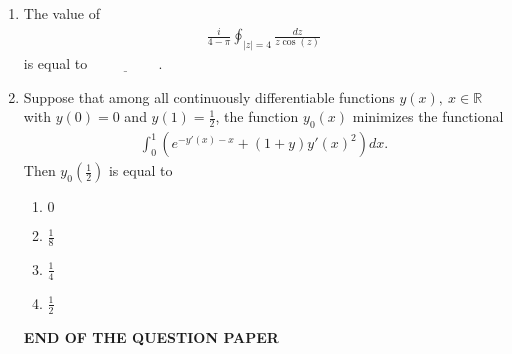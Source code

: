 \documentclass[journal]{IEEEtran}
\numberwithin{equation}{enumi}
\numberwithin{figure}{enumi}
\begin{document}
\begin{enumerate}
\item The value of
\begin{align*}
\frac{i}{4 - \pi} \oint_{|z| = 4} \frac{dz}{z \cos(z)}
\end{align*}
is equal to \(\underline{\hspace{2cm}}\).
\hfill{}

\vspace{1em}

\item Suppose that among all continuously differentiable functions \( y(x), \ x \in \mathbb{R} \) with \( y(0) = 0 \) and \( y(1) = \frac{1}{2} \), the function \( y_0(x) \) minimizes the functional
\begin{align*}
\int_{0}^{1} \left( e^{-y'(x) - x} + (1+y)y'(x)^2 \right) dx.
\end{align*}
Then \( y_0\left(\frac{1}{2}\right) \) is equal to
\hfill{}
\begin{multicols}{2}
\begin{enumerate}
    \item \( 0 \)
    \item \( \frac{1}{8} \) 
    \item \( \frac{1}{4} \)
    \item \( \frac{1}{2} \)
\end{enumerate}
\end{multicols}



\begin{center}
    \textbf{END OF THE QUESTION PAPER}
\end{center}
  


   \end{enumerate}
\end{document}
